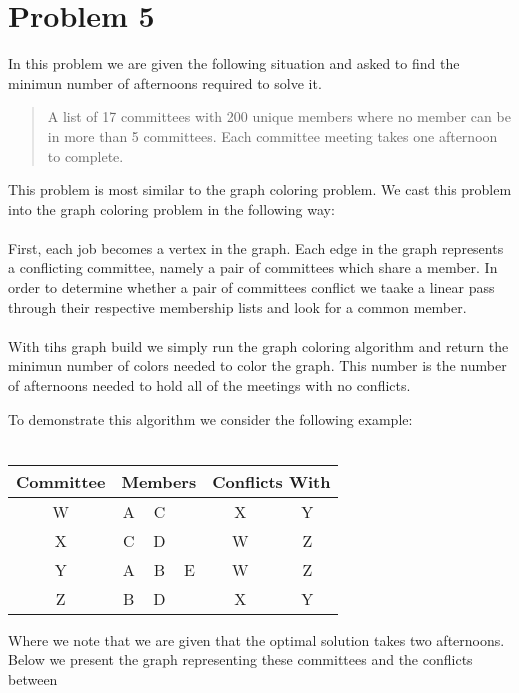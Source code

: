 \section*{Problem 5}

In this problem we are given the following situation and asked to find the 
minimun number of afternoons required to solve it.

\begin{quote}
    A list of 17 committees with 200 unique members where no member can be in more
    than 5 committees. Each committee meeting takes one afternoon to complete.
\end{quote}
%
This problem is most similar to the graph coloring problem. We cast this problem
into the graph coloring problem in the following way:
\\
\\
First, each job becomes a vertex in the graph. Each edge in the graph represents a
conflicting committee, namely a pair of committees which share a member. In order 
to determine whether a pair of committees conflict we taake a linear pass through 
their respective membership lists and look for a common member.
\\
\\
With tihs graph build we simply run the graph coloring algorithm and return the 
minimun number of colors needed to color the graph. This number is the number of 
afternoons needed to hold all of the meetings with no conflicts.
\begin{center}
To demonstrate this algorithm we consider the following example: 
\\\hfill
\\
    \begin{tabular}{| c | c  c  c| c c | }
        \hline
        \textbf{Committee} & \multicolumn{3}{l|}{\textbf{Members}} & 
        \multicolumn{2}{l|}{\textbf{Conflicts With}} \\
        \hline
        W & A & C & & X & Y \\
        \hline
        X & C & D & & W & Z \\
        \hline
        Y & A & B &E& W & Z \\
        \hline
        Z & B & D & & X & Y \\
        \hline
    \end{tabular}
\end{center}
%
Where we note that we are given that the optimal solution takes two afternoons. 
Below we present the graph representing these committees and the conflicts between
